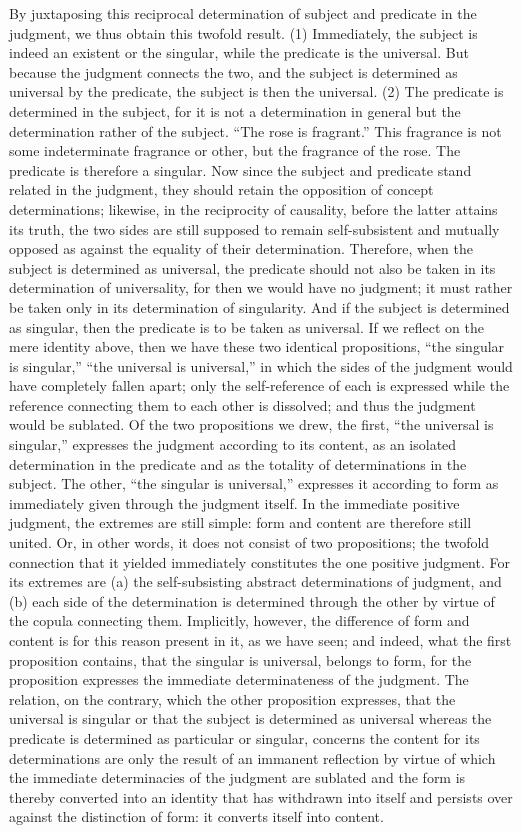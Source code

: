 By juxtaposing this reciprocal determination of
subject and predicate in the judgment,
we thus obtain this twofold result.
(1) Immediately, the subject is indeed
an existent or the singular,
while the predicate is the universal.
But because the judgment connects the two,
and the subject is determined as
universal by the predicate,
the subject is then the universal.
(2) The predicate is determined in the subject,
for it is not a determination in general
but the determination rather of the subject.
“The rose is fragrant.”
This fragrance is not some indeterminate fragrance or other,
but the fragrance of the rose.
The predicate is therefore a singular.
Now since the subject and predicate stand related in the judgment,
they should retain the opposition of concept determinations;
likewise, in the reciprocity of causality,
before the latter attains its truth,
the two sides are still
supposed to remain self-subsistent
and mutually opposed as against
the equality of their determination.
Therefore, when the subject is determined as universal,
the predicate should not also be taken
in its determination of universality,
for then we would have no judgment;
it must rather be taken only in its
determination of singularity.
And if the subject is determined as singular,
then the predicate is to be taken as universal.
If we reflect on the mere identity above,
then we have these two identical propositions,
“the singular is singular,”
“the universal is universal,”
in which the sides of the judgment
would have completely fallen apart;
only the self-reference of each is
expressed while the reference connecting
them to each other is dissolved;
and thus the judgment would be sublated.
Of the two propositions we drew,
the first, “the universal is singular,”
expresses the judgment according to its content,
as an isolated determination in the predicate
and as the totality of determinations in the subject.
The other, “the singular is universal,”
expresses it according to form as immediately given
through the judgment itself.
In the immediate positive judgment,
the extremes are still simple:
form and content are therefore still united.
Or, in other words, it does not
consist of two propositions;
the twofold connection that it yielded
immediately constitutes the one positive judgment.
For its extremes are
(a) the self-subsisting abstract determinations of judgment,
and (b) each side of the determination is determined
through the other by virtue of the copula connecting them.
Implicitly, however, the difference of form and content
is for this reason present in it, as we have seen;
and indeed, what the first proposition contains,
that the singular is universal, belongs to form,
for the proposition expresses the
immediate determinateness of the judgment.
The relation, on the contrary,
which the other proposition expresses,
that the universal is singular
or that the subject is determined as universal
whereas the predicate is determined as particular or singular,
concerns the content for its determinations are only
the result of an immanent reflection
by virtue of which the immediate determinacies of
the judgment are sublated
and the form is thereby converted into an identity
that has withdrawn into itself
and persists over against the distinction of form:
it converts itself into content.

